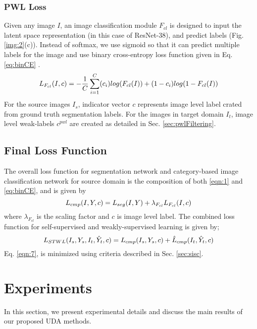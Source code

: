 \documentclass[10pt,twocolumn,letterpaper]{article}
\begin{document}
\subsubsection{PWL Loss}
Given any image $I$, an image classification module $F_{cl}$ is designed to input the latent space representation (in this case of ResNet-38), and predict labels (Fig. \ref{img:2}(c)). Instead of softmax, we use sigmoid so that it can predict multiple labels for the image and use binary cross-entropy loss function given in Eq.\ref{eq:binCE} .
\begin{equation}
\label{eq:binCE}
\footnotesize
L_{F_{cl}} (I, c) = - \frac{1}{C} \sum_{i=1}^C (c_i) log(F_{cl}(I)) + (1 - c_i) log(1 - F_{cl}(I))
\end{equation}
For the source images $I_s$, indicator vector $c$ represents image level label crated from ground truth segmentation labels. For the images in target domain $I_t$, image level weak-labels $c^{pwl}$ are created as detailed in Sec. \ref{sec:pwlFiltering}. 



\subsection{Final Loss Function}

The overall loss function for segmentation network and category-based image classification network for source domain is the composition of both \ref{eqn:1} and \ref{eq:binCE}, and is given by 
\begin{equation}
\small
L_{cmp} (I, Y, c) = L_{seg} (I, Y) + \lambda_{F_{cl}} L_{F_{cl}} (I, c)
\label{eqn:5}
\end{equation}
where $\lambda_{F_{cl}}$ is the scaling factor and $c$ is image level label. 
The combined loss function for self-supervised and weakly-supervised learning is given by;
\begin{equation}
\small
L_{STWL} ( I_s, Y_s, I_t, \hat{Y}_t, c) = L_{cmp} (I_s, Y_s, c)\\ + \hat{L}_{cmp} (I_t, \hat{Y}_t, c)
\label{eqn:7}
\end{equation}
Eq. \ref{eqn:7}, is minimized using criteria described in Sec. \ref{sec:sisc}.
\section{Experiments}
\label{sec:exp}
In this section, we present experimental details and discuss the main results of our proposed UDA methods.
\end{document}
